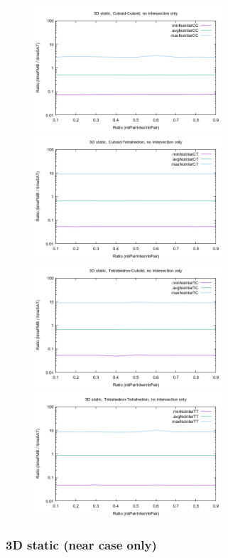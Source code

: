 \documentclass[12pt, a4paper]{article}
\begin{document}
\begin{center}
\begin{figure}[H]
\centering\includegraphics[width=7cm]{../Results/qualification3DCCnointer.png}
\centering\includegraphics[width=7cm]{../Results/qualification3DCTnointer.png}
\centering\includegraphics[width=7cm]{../Results/qualification3DTCnointer.png}
\centering\includegraphics[width=7cm]{../Results/qualification3DTTnointer.png}
\end{figure}
\end{center}

\subsubsection{3D static (near case only)}
\end{document}
